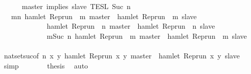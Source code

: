 \begin{isabellebody}
\ \ \ \ {\isasyminter}\ {\isasymlbrakk}\ master\ implies\ slave\ {\isasymrbrakk}\isactrlsub T\isactrlsub E\isactrlsub S\isactrlsub L\isactrlbsup {\isasymge}\ Suc\ n\isactrlesup {\isacartoucheclose}\isanewline
%
\isadelimproof
\ \ %
\endisadelimproof
%
\isatagproof
{}\isamarkupfalse%
\ {\isacharminus}\isanewline
\ \ \ \ \isamarkupfalse%
\ {\isacartoucheopen}{\isacharbraceleft}\ {\isasymrho}{\isachardot}\ {\isasymforall}m{\isasymge}n{\isachardot}\ hamlet\ {\isacharparenleft}{\isacharparenleft}Rep{\isacharunderscore}run\ {\isasymrho}{\isacharparenright}\ m\ master{\isacharparenright}\ {\isasymlongrightarrow}\ hamlet\ {\isacharparenleft}{\isacharparenleft}Rep{\isacharunderscore}run\ {\isasymrho}{\isacharparenright}\ m\ slave{\isacharparenright}\ {\isacharbraceright}\isanewline
\ \ \ \ \ \ \ \ \ \ {\isacharequal}\ {\isacharbraceleft}\ {\isasymrho}{\isachardot}\ hamlet\ {\isacharparenleft}{\isacharparenleft}Rep{\isacharunderscore}run\ {\isasymrho}{\isacharparenright}\ n\ master{\isacharparenright}\ {\isasymlongrightarrow}\ hamlet\ {\isacharparenleft}{\isacharparenleft}Rep{\isacharunderscore}run\ {\isasymrho}{\isacharparenright}\ n\ slave{\isacharparenright}\ {\isacharbraceright}\isanewline
\ \ \ \ \ \ \ \ \ \ {\isasyminter}\ {\isacharbraceleft}\ {\isasymrho}{\isachardot}\ {\isasymforall}m{\isasymge}Suc\ n{\isachardot}\ hamlet\ {\isacharparenleft}{\isacharparenleft}Rep{\isacharunderscore}run\ {\isasymrho}{\isacharparenright}\ m\ master{\isacharparenright}\ {\isasymlongrightarrow}\ hamlet\ {\isacharparenleft}{\isacharparenleft}Rep{\isacharunderscore}run\ {\isasymrho}{\isacharparenright}\ m\ slave{\isacharparenright}\ {\isacharbraceright}{\isacartoucheclose}\isanewline
\ \ \ \ \ \ \isamarkupfalse%
\ nat{\isacharunderscore}set{\isacharunderscore}suc{\isacharbrackleft}of\ {\isacartoucheopen}n{\isacartoucheclose}\ {\isacartoucheopen}{\isasymlambda}x\ y{\isachardot}\ hamlet\ {\isacharparenleft}{\isacharparenleft}Rep{\isacharunderscore}run\ x{\isacharparenright}\ y\ master{\isacharparenright}\ {\isasymlongrightarrow}\ hamlet\ {\isacharparenleft}{\isacharparenleft}Rep{\isacharunderscore}run\ x{\isacharparenright}\ y\ slave{\isacharparenright}{\isacartoucheclose}{\isacharbrackright}\ \isamarkupfalse%
\ simp\isanewline
\ \ \ \ \isamarkupfalse%
\ \isamarkupfalse%
\ {\isacharquery}thesis\ \isamarkupfalse%
\ auto\isanewline
\ \ \isamarkupfalse%
%
\endisatagproof
{\isafoldproof}%
%
\isadelimproof
\isanewline
%
\endisadelimproof
\isanewline
{}\isamarkupfalse%

\end{isabellebody}
